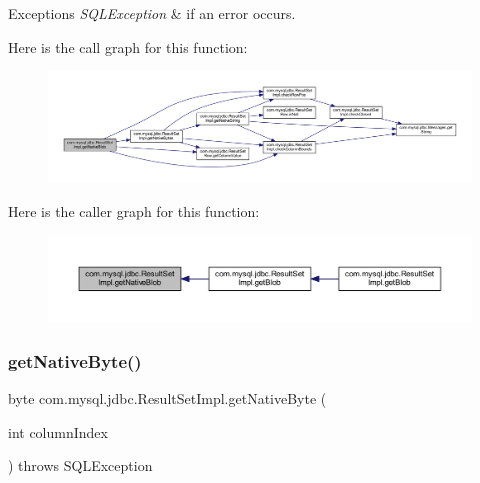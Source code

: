 \begin{DoxyExceptions}{Exceptions}
{\em S\+Q\+L\+Exception} & if an error occurs. \\
\hline
\end{DoxyExceptions}
Here is the call graph for this function\+:
\nopagebreak
\begin{figure}[H]
\begin{center}
\leavevmode
\includegraphics[width=350pt]{classcom_1_1mysql_1_1jdbc_1_1_result_set_impl_a3ba3c173658eb8ab87c1f0040cc50fac_cgraph}
\end{center}
\end{figure}
Here is the caller graph for this function\+:
\nopagebreak
\begin{figure}[H]
\begin{center}
\leavevmode
\includegraphics[width=350pt]{classcom_1_1mysql_1_1jdbc_1_1_result_set_impl_a3ba3c173658eb8ab87c1f0040cc50fac_icgraph}
\end{center}
\end{figure}
\mbox{\label{classcom_1_1mysql_1_1jdbc_1_1_result_set_impl_a7b543fcc945651d4e6722a3048c22e94}} 
\subsubsection{\texorpdfstring{get\+Native\+Byte()}{getNativeByte()}}
{\footnotesize\ttfamily byte com.\+mysql.\+jdbc.\+Result\+Set\+Impl.\+get\+Native\+Byte (\begin{DoxyParamCaption}\item[{int}]{column\+Index }\end{DoxyParamCaption}) throws S\+Q\+L\+Exception\hspace{0.3cm}{\ttfamily [protected]}}

